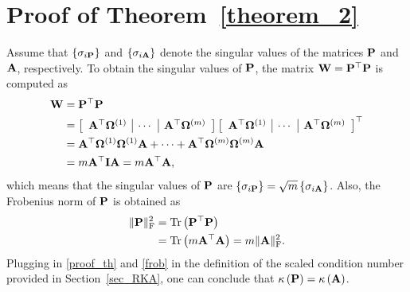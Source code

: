 \documentclass[12pt,draftcls,onecolumn]{IEEEtran}
\begin{document}
\section{Proof of Theorem~\ref{theorem_2}}
\label{akk}
Assume that $\left\{\sigma_{i\mathbf{P}}\right\}$ and $\left\{\sigma_{i\mathbf{A}}\right\}$ denote the singular values of the matrices $\mathbf{P}$ and $\mathbf{A}$, respectively.
To obtain the singular values of $\mathbf{P}$, the matrix $\mathbf{W} = \mathbf{P}^{\top}\mathbf{P}$ is computed as 
\begin{equation}
\label{proof_th}
\begin{aligned}
\mbW &= \mbP^{\top}\mbP\\&=  \left[\begin{array}{c|c|c}
\mbA^{\top}\bOmega^{(1)} &\cdots &\mbA^{\top}\bOmega^{(m)}
\end{array}\right]\left[\begin{array}{c|c|c}
\mbA^{\top}\bOmega^{(1)} &\cdots &\mbA^{\top}\bOmega^{(m)}
\end{array}\right]^{\top}\\
&=\mbA^{\top}\bOmega^{(1)}\bOmega^{(1)}\mbA+\cdots+\mbA^{\top}\bOmega^{(m)}\bOmega^{(m)}\mbA\\
&= m\mbA^{\top}\mbI\mbA=m\mbA^{\top}\mbA,
\end{aligned}
\end{equation}\normalsize
which means that the singular values of $\mathbf{P}$ are $\left\{\sigma_{i\mathbf{P}}\right\}=\sqrt{m}\left\{\sigma_{i\mathbf{A}}\right\}$. Also, the Frobenius norm of  
$\mathbf{P}$ is obtained as
\begin{equation}
\label{frob}
\begin{aligned}
\|\mbP\|^{2}_{\mathrm{F}}&=\operatorname{Tr}\left(\mbP^{\top}\mbP\right)\\ &= \operatorname{Tr}\left(m\mbA^{\top}\mbA\right) = m\|\mbA\|^{2}_{\mathrm{F}}.
\end{aligned}
\end{equation}
Plugging in \eqref{proof_th} and \eqref{frob} in the definition of the scaled condition number provided in Section~\ref{sec_RKA}, one can conclude that $\kappa\left(\mathbf{P}\right)=\kappa\left(\mathbf{A}\right)$.
\end{document}
